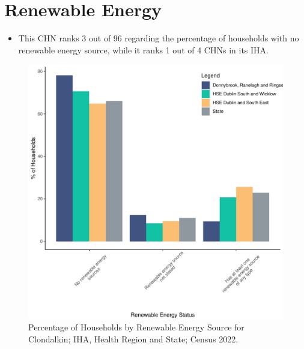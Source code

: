 \documentclass{article}
\begin{document}
\section{Renewable Energy}\label{sect:RE}
\begin{itemize}
\item This CHN ranks  3 out of 96 regarding the percentage of households with no renewable energy source, while it ranks   1 out of 4 CHNs in its IHA.
\end{itemize}
\begin{figure}[H]
	\centering
	\includegraphics[width = 140mm]{../figures/RenewableEnergyED.pdf}
	\caption{Percentage of Households by Renewable Energy Source for Clondalkin; IHA, Health Region and State; Census 2022.}
	\label{fig:vbnv}
	\end{figure}
\end{document}
